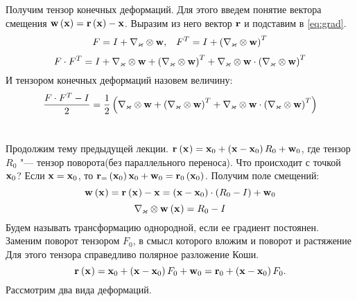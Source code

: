 \documentclass[a4papper, 14pt]{book}
\renewcommand{\kappa}{\ensuremath{\varkappa}}
\newcommand{\diad}{\ensuremath\otimes}
\newcommand{\rx}[3]{\ensuremath\mf{r}_{#3}\left({\mathbf{#1}}_{#2} \right)}
\newcommand{\wx}[3]{\ensuremath\mf{w}_{#3}\left({\mathbf{#1}}_{#2} \right)}
\newcommand{\mf}[1]{\ensuremath\mathbf{#1}}
\theoremstyle{plain} %
\theoremstyle{definition} %
\theoremstyle{remark} %
\begin{document}
	Получим тензор конечных деформаций. Для этого введем понятие вектора смещения $\mf{w}\left(\mf{x}\right)  = \mf{r}\left(\mf{x}\right) - \mf{x}$. Выразим из него вектор $\mf{r}$ и подставим в \eqref{eq:grad}. 
	\begin{align}
	&F = I +\nabla_{\kappa}\diad \mf{w},&   F^T = I + \left(\nabla_{\kappa}\diad \mf{w}\right)^T
	\end{align}
	\begin{equation}
	F\cdot F^T = I + \nabla_{\kappa}\diad \mf{w} +\left(\nabla_{\kappa}\diad \mf{w}\right)^T + \nabla_{\kappa}\diad \mf{w}\cdot\left(\nabla_{\kappa}\diad \mf{w}\right)^T
	\end{equation}
	И тензором конечных деформаций назовем величину: 
	\begin{equation}
	\dfrac{F\cdot F^T - I}{2} = \dfrac{1}{2}\left(\nabla_{\kappa}\diad \mf{w} +\left(\nabla_{\kappa}\diad \mf{w}\right)^T + \nabla_{\kappa}\diad \mf{w}\cdot\left(\nabla_{\kappa}\diad \mf{w}\right)^T\right)
	\end{equation}
	\setcounter{chapter}{2}
	\section{}
	Продолжим тему предыдущей лекции. $\rx{x}{}{} = \mf{x}_0 + \left(\mf{x} - \mf{x}_0 \right)R_0 + \mf{w}_0$, где тензор $R_0$ "--- тензор поворота(без параллельного переноса). Что происходит с точкой $\mf{x}_0$? Если $\mf{x} = \mf{x}_0$, то $\rx{x}{0} = \mf{x}_0 + \mf{w}_0 = \mf{r}_0 \left(\mf{x}_0 \right)$. Получим поле смещений:
	\begin{equation}
	\wx{x}{}{} = \rx{x}{}{} - \mf{x} = \left(\mf{x} - \mf{x}_0\right)\cdot \left(R_0 - I\right) +\mf{w}_0
	\end{equation}
	\begin{equation}
	\nabla_{\kappa}\diad\wx{x}{}{} = R_0 - I
	\end{equation}
	Будем называть трансформацию однородной, если ее градиент постоянен. Заменим поворот тензором $F_0$, в смысл которого вложим и поворот и растяжение Для этого тензора справедливо полярное разложение Коши.
	\begin{equation}
	\rx{x}{}{} =\mf{x}_0 + \left( \mf{x} - \mf{x}_0 \right)F_0 + \mf{w}_0 = \mf{r}_0 + \left( \mf{x} - \mf{x}_0 \right)F_0.
	\end{equation}
	Рассмотрим два вида деформаций. 
\end{document}
